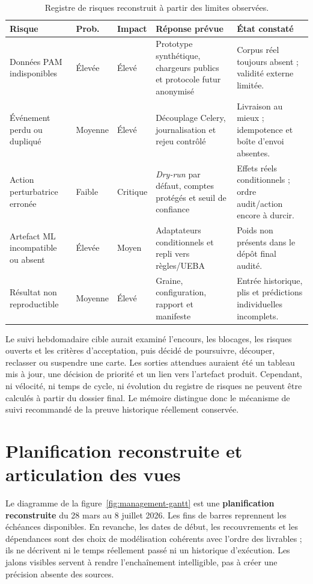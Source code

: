 \documentclass[11pt,a4paper,oneside]{report}
\theoremstyle{definition}
\theoremstyle{plain}
\begin{document}
\begin{table}[H]
\centering
\small
\caption{Registre de risques reconstruit à partir des limites observées.}
\label{tab:management-risks}
\begin{tabularx}{\textwidth}{@{}p{2.5cm}p{1.25cm}p{1.25cm}X X@{}}
\toprule
\textbf{Risque} & \textbf{Prob.} & \textbf{Impact} &
\textbf{Réponse prévue} & \textbf{État constaté}\\
\midrule
Données PAM indisponibles & Élevée & Élevé &
Prototype synthétique, chargeurs publics et protocole futur anonymisé &
Corpus réel toujours absent ; validité externe limitée.\\
Événement perdu ou dupliqué & Moyenne & Élevé &
Découplage Celery, journalisation et rejeu contrôlé &
Livraison au mieux ; idempotence et boîte d'envoi absentes.\\
Action perturbatrice erronée & Faible & Critique &
\emph{Dry-run} par défaut, comptes protégés et seuil de confiance &
Effets réels conditionnels ; ordre audit/action encore à durcir.\\
Artefact ML incompatible ou absent & Élevée & Moyen &
Adaptateurs conditionnels et repli vers règles/UEBA &
Poids non présents dans le dépôt final audité.\\
Résultat non reproductible & Moyenne & Élevé &
Graine, configuration, rapport et manifeste &
Entrée historique, plis et prédictions individuelles incomplets.\\
\bottomrule
\end{tabularx}
\end{table}

Le suivi hebdomadaire cible aurait examiné l'encours, les blocages, les risques
ouverts et les critères d'acceptation, puis décidé de poursuivre, découper,
reclasser ou suspendre une carte. Les sorties attendues auraient été un tableau
mis à jour, une décision de priorité et un lien vers l'artefact produit.
Cependant, ni vélocité, ni temps de cycle, ni évolution du registre de risques
ne peuvent être calculés à partir du dossier final. Le mémoire distingue donc
le mécanisme de suivi recommandé de la preuve historique réellement conservée.

\section{Planification reconstruite et articulation des vues}

Le diagramme de la figure~\ref{fig:management-gantt} est une
\textbf{planification reconstruite} du 28 mars au 8 juillet 2026. Les fins de
barres reprennent les échéances disponibles. En revanche, les dates de début,
les recouvrements et les dépendances sont des choix de modélisation cohérents
avec l'ordre des livrables ; ils ne décrivent ni le temps réellement passé ni
un historique d'exécution. Les jalons visibles servent à rendre l'enchaînement
intelligible, pas à créer une précision absente des sources.
\end{document}

